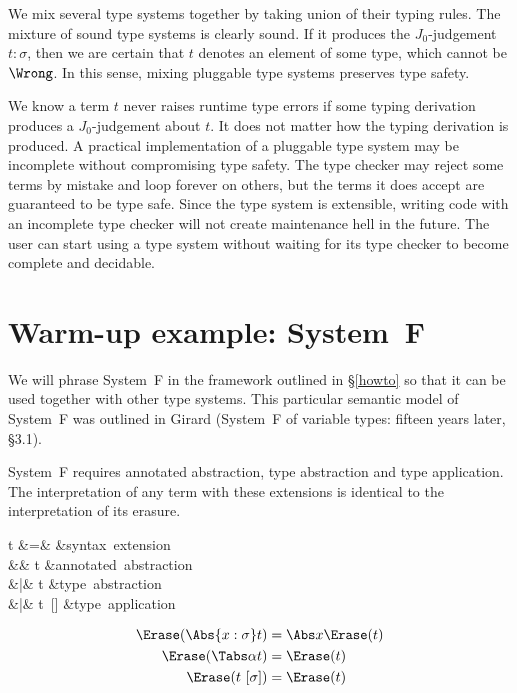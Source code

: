 \documentclass{amsart}
\begin{document}
We mix several type systems together by taking union of their
typing rules. The mixture of sound type systems is clearly sound.
If it produces the $J_0$-judgement $t:\sigma$, then we are
certain that $t$ denotes an element of some type, which cannot be
$\Wrong$. In this sense, mixing pluggable type systems preserves
type safety.

We know a term $t$ never raises runtime type errors if some
typing derivation produces a $J_0$-judgement about $t$. It does
not matter how the typing derivation is produced. A practical
implementation of a pluggable type system may be incomplete
without compromising type safety. The type checker may reject
some terms by mistake and loop forever on others, but the terms
it does accept are guaranteed to be type safe. Since the type
system is extensible, writing code with an incomplete type
checker will not create maintenance hell in the future. The user
can start using a type system without waiting for its type
checker to become complete and decidable.



\section{Warm-up example: System~F}

We will phrase System~F in the framework outlined in
\S\ref{howto} so that it can be used together with other type
systems. This particular semantic model of System~F was outlined
in Girard (System~F of variable types: fifteen years later,
\S3.1).


System~F requires annotated abstraction, type abstraction and
type application. The interpretation of any term with these
extensions is identical to the interpretation of its erasure.

\begin{syntax}
t &\+=& &\mbox{syntax extension} \\
&& t &\mbox{annotated abstraction}\\
&|& \Tabs\alpha t &\mbox{type abstraction}\\
&|& t~[\sigma] &\mbox{type application}\\
\end{syntax}%

\begin{align*}
\Erase(\Abs{x:\sigma}t) & = \Abs x\Erase(t) \\
\Erase(\Tabs\alpha t) &= \Erase(t) \\
\Erase(t~[\sigma]) &= \Erase(t)
\end{align*}
\end{document}
